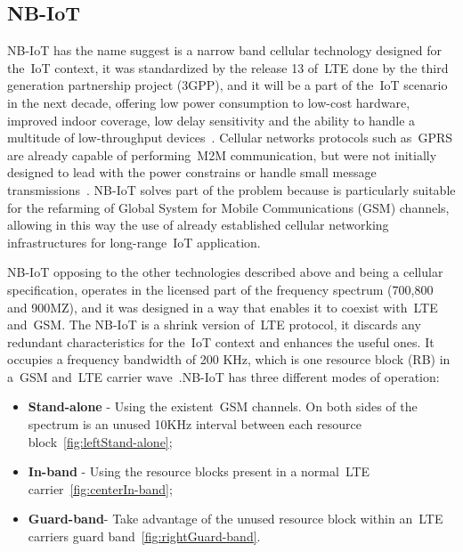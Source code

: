 \newpage
\subsection{NB-IoT} %
\label{sec:nb_sota}

NB-IoT has the name suggest is a narrow band cellular technology designed for the~\gls{IoT} context, it was standardized by the release 13 of~\gls{LTE} done by the third generation partnership project (3GPP), and it will be a part of the~\gls{IoT} scenario in the next decade, offering low power consumption to low-cost hardware, improved indoor coverage, low delay sensitivity and the ability to handle a multitude of low-throughput devices~\cite{Gozalvez2016}. Cellular networks protocols such as~\gls{GPRS} are already capable of performing~\gls{M2M} communication, but were not  initially designed to lead with the power constrains or handle small message transmissions~\cite{Anteur2016}. NB-IoT solves part of the problem because is particularly suitable for the refarming of Global System for Mobile Communications (\gls{GSM}) channels, allowing in this way the use of  already established cellular networking infrastructures for long-range~\gls{IoT} application.

NB-IoT opposing to the other technologies described above and being a cellular specification, operates in the licensed part of the frequency spectrum (700,800 and 900MZ), and it was designed in a way that enables it to coexist with~\gls{LTE} and~\gls{GSM}. The NB-IoT is a shrink version of~\gls{LTE} protocol, it discards any redundant characteristics for the~\gls{IoT} context and enhances the useful ones. It occupies a frequency bandwidth of 200 KHz, which is one resource block (RB) in a~\gls{GSM} and~\gls{LTE} carrier wave~\cite{Mekki2019}.\newline NB-IoT has three different modes of operation:
\begin{itemize}
	\item \textbf{Stand-alone} - Using the existent~\gls{GSM} channels. On both sides of the spectrum is an unused 10KHz interval between each resource block~\ref{fig:leftStand-alone};
	\item\textbf{In-band} - Using the resource blocks present in a normal~\gls{LTE} carrier~\ref{fig:centerIn-band};
	\item \textbf{Guard-band}- Take advantage of the unused resource block within an~\gls{LTE} carriers guard band~\ref{fig:rightGuard-band}.

\end{itemize} 

